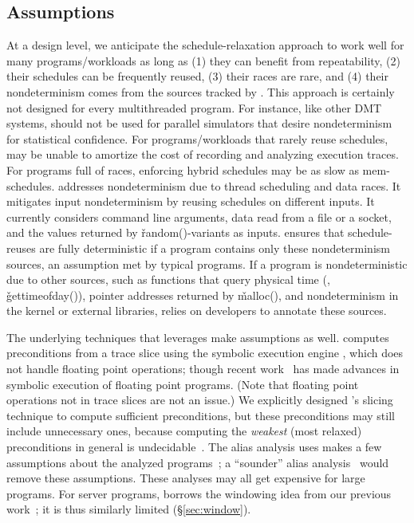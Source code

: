 \subsection{Assumptions} \label{sec:peregrine-limitations}

At a design level, we anticipate the schedule-relaxation approach to work
well for many programs/workloads as long as (1) they can benefit from
repeatability, (2) their schedules can be frequently reused, (3) their
races are rare, and (4) their nondeterminism comes from the sources
tracked by \peregrine.  This approach is certainly not designed for every
multithreaded program. For instance, like other DMT systems, \peregrine should
not be used for parallel simulators that desire nondeterminism for
statistical confidence.  For programs/workloads that rarely reuse
schedules, \peregrine may be unable to amortize the cost of recording and
analyzing execution traces.  For programs full of races, enforcing hybrid
schedules may be as slow as mem-schedules.  \peregrine addresses nondeterminism
due to thread scheduling and data races.  It mitigates input
nondeterminism by reusing schedules on different inputs.  It currently
considers command line arguments, data read from a file or a socket, and
the values returned by \v{random()}-variants as inputs.  \peregrine ensures that
schedule-reuses are fully deterministic if a program contains only these
nondeterminism sources, an assumption met by typical programs.  If a
program is nondeterministic due to other sources, such as functions that
query physical time (\eg, \v{gettimeofday()}), pointer addresses returned
by \v{malloc()}, and nondeterminism in the kernel or external libraries,
\peregrine relies on developers to annotate these sources.


The underlying techniques that \peregrine leverages make assumptions as well.
\peregrine computes preconditions from a trace slice using the symbolic
execution engine \klee, which does not handle floating point operations;
though recent work~\cite{klee-fp} has made advances in symbolic execution
of floating point programs.  (Note
that floating point operations not in trace slices are not an issue.)  We
explicitly designed \peregrine's slicing technique to compute sufficient
preconditions, but these preconditions may still include unnecessary ones,
because computing the \emph{weakest} (most relaxed) preconditions in general is
undecidable~\cite{aho:dragon:06}.  The alias analysis \peregrine uses makes a
few assumptions about the analyzed programs~\cite{alias:icse05};
a ``sounder'' alias analysis~\cite{alias:fse06} would remove these
assumptions.  These analyses may all get expensive for large
programs.  For server programs, \peregrine borrows the
windowing idea from our previous work~\cite{cui:tern:osdi10}; it is thus
similarly limited (\S\ref{sec:window}).

